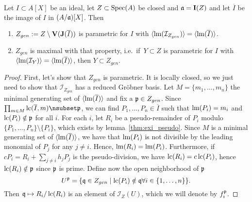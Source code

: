 \begin{theorem}\label{thm:Z_gen_para}
  Let $I \subset A[X]$ be an ideal, let $Z \subset \operatorname{Spec}(A)$ be closed and $\mathfrak{a} = \operatorname{\mathbf I}(Z)$ and let $\overline I$ be the image of $I$ in $(A/\mathfrak{a})[X]$. Then
  \begin{enumerate}
    \item $Z_{gen} := Z \setminus \operatorname{\mathbf V}(\operatorname{\mathbf J}(\overline I))$ is parametric for $I$ with $\langle \operatorname{lm}(\mathcal I_{Z_{gen}}) \rangle = \langle \operatorname{lm}(\overline I) \rangle$.
    \item $Z_{gen}$ is maximal with that property, i.e.\ if $\,Y \subset Z$ is parametric for $I$ with $\langle \operatorname{lm}(\mathcal I_{Y}) \rangle = \langle \operatorname{lm}(\overline I) \rangle$, then $Y \subset Z_{gen}$.
  \end{enumerate}
\end{theorem}
\begin{proof}
  First, let's show that $Z_{gen}$ is parametric. It is locally closed, so we just need to show that $\mathcal I_{Z_{gen}}$ has a reduced Gröbner basis. Let $M = \{m_{1}, \dots, m_{n}\}$ the minimal generating set of $\langle \operatorname{lm}(\overline I) \rangle$ and fix a $\mathfrak p \in Z_{gen}$. Since $\prod_{m \in M} \LC(\overline I, m) \nsubset \p$, we can find $P_{1}, \dots, P_{n} \in \overline I$ such that $\operatorname{lm}(P_{i}) = m_{i}$ and $\operatorname{lc}(P_{i}) \notin \mathfrak p$ for all $i$. For each $i$, let $R_{i}$ be a pseudo-remainder of $P_{i}$ modulo $\{P_{1}, \dots, P_{n}\} \setminus \{P_{i}\}$, which exists by lemma~\ref{thm:exi_pseudo}. Since $M$ is a minimal generating set of $\langle \operatorname{lm}(\overline I) \rangle$, we have that $\operatorname{lm}(P_{i})$ is not divisible by the leading monomial of $P_{j}$ for any $j \neq i$. Hence, $\operatorname{lm}(R_{i}) = \operatorname{lm}(P_{i})$. Furthermore, if $c P_{i} = R_{i} + \sum_{j \neq i} h_{j} P_{j}$ is the pseudo-division, we have $\operatorname{lc}(R_{i}) = c \operatorname{lc}(P_{i})$, hence $\operatorname{lc}(R_{i}) \notin \mathfrak p$ since $\mathfrak p$ is prime. Define now the open neighborhood of $\mathfrak p$
  \[U^{\mathfrak p} = \{\mathfrak{q} \in Z_{gen} \mid \operatorname{lc}(P_{i}) \notin \mathfrak{q} \forall i \in \{1, \dots, n\}\}.\]
  Then $\mathfrak{q} \mapsto R_{i}/\operatorname{lc}(R_{i})$ is an element of $\mathcal I_{Z}(U)$, which we will denote by $f^{\mathfrak p}_{i}$.


\end{proof}
